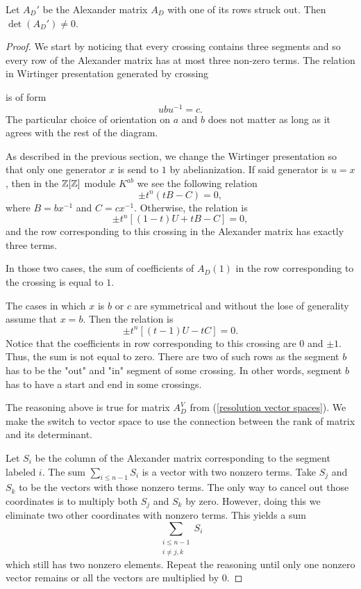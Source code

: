 \begin{lemma}\label{alexander matrix has trivial kernel}
  Let $A_D'$ be the Alexander matrix $A_D$ with one of its rows struck out. Then $\det(A_D')\neq 0$.
\end{lemma}

\begin{proof}
  We start by noticing that every crossing contains three segments and so every row of the Alexander matrix has at most three non-zero terms. The relation in Wirtinger presentation generated by crossing 
  \begin{center}
  \end{center}
  is of form
  $$ubu^{-1}=c.$$
  The particular choice of orientation on $a$ and $b$ does not matter as long as it agrees with the rest of the diagram.

  As described in the previous section, we change the Wirtinger presentation so that only one generator $x$ is send to $1$ by abelianization. If said generator is $u=x$, then in the $\operatorname{\mathbb{Z}}[\operatorname{\mathbb{Z}}]$ module $K^{ab}$ we see the following relation 
  $$\pm t^n(tB-C)=0,$$
  where $B=bx^{-1}$ and $C=cx^{-1}$. Otherwise, the relation is
  $$\pm t^n[(1-t)U+tB-C]=0,$$
  and the row corresponding to this crossing in the Alexander matrix has exactly three terms.

  In those two cases, the sum of coefficients of $A_D(1)$ in the row corresponding to the crossing is equal to $1$.

  The cases in which $x$ is $b$ or $c$ are symmetrical and without the lose of generality assume that $x=b$. Then the relation is 
  $$\pm t^n[(t-1)U-tC]=0.$$
  Notice that the coefficients in row corresponding to this crossing are $0$ and $\pm1$. Thus, the sum is not equal to zero. There are two of such rows as the segment $b$ has to be the "out" and "in" segment of some crossing. In other words, segment $b$ has to have a start and end in some crossings.

  The reasoning above is true for matrix $A_D^V$ from (\ref{resolution vector spaces}). We make the switch to vector space to use the connection between the rank of matrix and its determinant.

  Let $S_i$ be the column of the Alexander matrix corresponding to the segment labeled $i$. The sum $\sum_{i\leq n-1} S_i$ is a vector with two nonzero terms. Take $S_j$ and $S_k$ to be the vectors with those nonzero terms. The only way to cancel out those coordinates is to multiply both $S_j$ and $S_k$ by zero. However, doing this we eliminate two other coordinates with nonzero terms. This yields a sum
  $$\sum_{\substack{i\leq n-1 \\ i\neq j,k}}S_i$$ 
  which still has two nonzero elements. Repeat the reasoning until only one nonzero vector remains or all the vectors are multiplied by $0$.


\end{proof}
